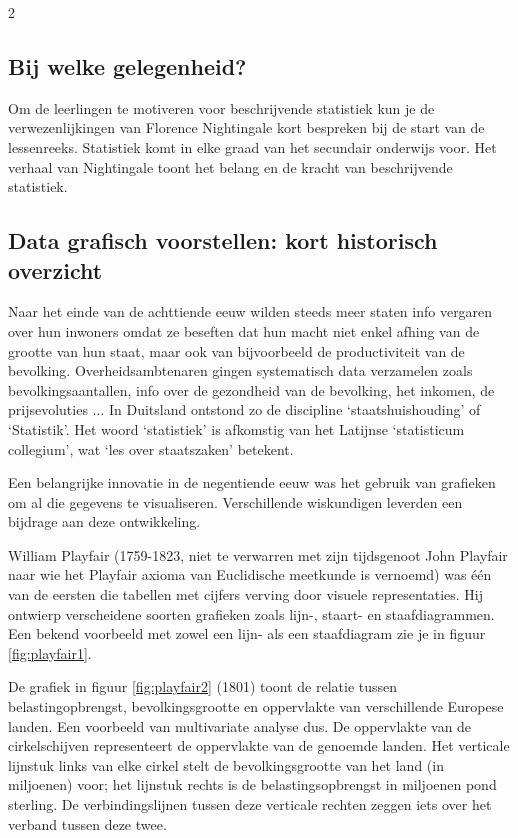 \begin{multicols}{2}
	\subsection*{Bij welke gelegenheid?}
	
	Om de leerlingen te motiveren voor beschrijvende statistiek kun je de verwezenlijkingen van Florence Nightingale kort bespreken bij de start van de lessenreeks. Statistiek komt in elke graad van het secundair onderwijs voor. Het verhaal van Nightingale toont het belang en de kracht van beschrijvende statistiek.
	
	\subsection*{Data grafisch voorstellen: kort historisch overzicht}
	
	Naar het einde van de achttiende eeuw wilden steeds meer staten info vergaren over hun inwoners omdat ze beseften dat hun macht niet enkel afhing van de grootte van hun staat, maar ook van bijvoorbeeld de productiviteit van de bevolking. Overheidsambtenaren gingen systematisch data verzamelen zoals bevolkingsaantallen, info over de gezondheid van de bevolking, het inkomen, de prijsevoluties $\ldots$ In Duitsland ontstond zo de discipline `staatshuishouding' of `Statistik'. Het woord `statistiek' is afkomstig van het Latijnse `statisticum collegium', wat `les over staatszaken' betekent.	
	
	Een belangrijke innovatie in de negentiende eeuw was het gebruik van grafieken om al die gegevens te visualiseren. Verschillende wiskundigen leverden een bijdrage aan deze ontwikkeling. 
 
 William Playfair (1759-1823, niet te verwarren met zijn tijdsgenoot John Playfair naar wie het Playfair axioma van Euclidische meetkunde is vernoemd) was één van de eersten die tabellen met cijfers verving door visuele representaties. Hij ontwierp verscheidene soorten grafieken zoals lijn-, staart- en staafdiagrammen. Een bekend voorbeeld met zowel een lijn- als een staafdiagram zie je in figuur \ref{fig:playfair1}.
    \vfill
    \clearpage
    
	
	De grafiek in figuur \ref{fig:playfair2} (1801) toont de relatie tussen belastingopbrengst, bevolkingsgrootte en oppervlakte van verschillende Europese landen. Een voorbeeld van multivariate analyse dus. De oppervlakte van de cirkelschijven representeert de oppervlakte van de genoemde landen. Het verticale lijnstuk links van elke cirkel stelt de bevolkingsgrootte van het land (in miljoenen) voor; het lijnstuk rechts is de belastingsopbrengst in miljoenen pond sterling. De verbindingslijnen tussen deze verticale rechten zeggen iets over het verband tussen deze twee.
 

\end{multicols}

